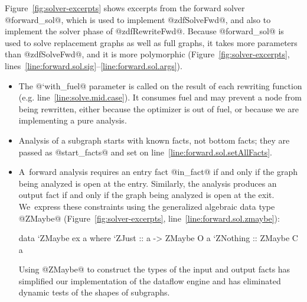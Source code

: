 \documentclass[blockstyle,preprint,natbib,nocopyrightspace]{sigplanconf}
\newcommand\lineref[1]{line~\ref{line:#1}}
\newcommand\linerangeref[2]{\mbox{lines~\ref{line:#1}--\ref{line:#2}}}
\newcommand\secref[1]{Section~\ref{sec:#1}}
\newcommand\figref[1]{Figure~\ref{fig:#1}}
\begin{document}
\figref{solver-excerpts} shows excerpts from the forward solver 
@forward_sol@, 
which is used to implement @zdfSolveFwd@,
and also to implement the solver phase of @zdfRewriteFwd@.
Because @forward_sol@ is used to solve replacement graphs as well as
full graphs, it
takes more parameters than @zdfSolveFwd@, and it is more polymorphic
(\figref{solver-excerpts}, \linerangeref{forward.sol.sig}{forward.sol.args}).
\begin{itemize}
\item
The @`with_fuel@ parameter 
is called on the result of each rewriting function (e.g. \lineref{solve.mid.case}).
It consumes fuel and may prevent a node from being rewritten,
either because the optimizer is out of fuel,
or because we are implementing a pure analysis.
\item
Analysis of a subgraph starts with known facts, not
bottom facts; they are passed as %
@start_facts@
and
 set on \lineref{forward.sol.setAllFacts}.
\item
A~forward analysis requires an entry fact @in_fact@ if and only if the
graph being analyzed is open at the entry.
Similarly, the analysis produces an output fact if and only if the
graph being analyzed is open at the exit.
We~express these constraints using the generalized algebraic data type
@ZMaybe@ (\figref{solver-excerpts}, \lineref{forward.sol.zmaybe}):
\begin{code}
data `ZMaybe ex a where
  `ZJust    :: a -> ZMaybe O a
  `ZNothing ::      ZMaybe C a
\end{code}
Using @ZMaybe@ to construct the types of the input and output facts
has simplified our implementation of the dataflow engine and has
eliminated dynamic tests of the shapes of subgraphs.
\end{itemize}
%
\end{document}
